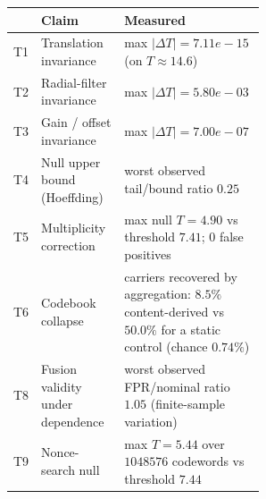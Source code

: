 \begin{tabular}{llp{0.56\linewidth}}
\toprule
& Claim & Measured \\
\midrule
T1 & Translation invariance & max $|\Delta T| = 7.11e-15$ (on $T \approx 14.6$) \\
T2 & Radial-filter invariance & max $|\Delta T| = 5.80e-03$ \\
T3 & Gain / offset invariance & max $|\Delta T| = 7.00e-07$ \\
T4 & Null upper bound (Hoeffding) & worst observed tail/bound ratio $0.25$ \\
T5 & Multiplicity correction & max null $T = 4.90$ vs threshold $7.41$; 0 false positives \\
T6 & Codebook collapse & carriers recovered by aggregation: $8.5\%$ content-derived vs $50.0\%$ for a static control (chance $0.74\%$) \\
T8 & Fusion validity under dependence & worst observed FPR/nominal ratio $1.05$ (finite-sample variation) \\
T9 & Nonce-search null & max $T = 5.44$ over $1048576$ codewords vs threshold $7.44$ \\
\bottomrule
\end{tabular}
